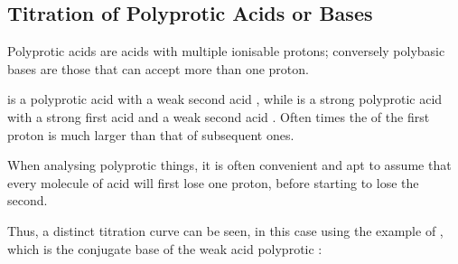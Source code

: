		\pagebreak
		\subsection{Titration of Polyprotic Acids or Bases}

			Polyprotic acids are acids with multiple ionisable protons; conversely polybasic bases are those that can accept more than one
			proton.

			 is a polyprotic acid with a weak second acid , while  is a strong polyprotic acid with a strong
			first acid and a weak second acid . Often times the \Ka{} of the first proton is much larger than that of subsequent ones.

			When analysing polyprotic things, it is often convenient and apt to assume that every molecule of acid will first lose one proton,
			before starting to lose the second.

			Thus, a distinct titration curve can be seen, in this case using the example of , which is the conjugate base of
			the weak acid polyprotic :



